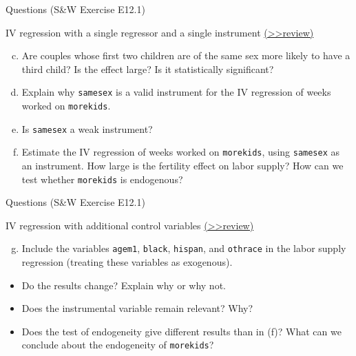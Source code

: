 \documentclass[
  10pt,
  ignorenonframetext,
]{beamer}
\providecommand{\tightlist}{%
  \setlength{\itemsep}{0pt}\setlength{\parskip}{0pt}}
\begin{document}
\begin{frame}[fragile]{Questions (S\&W Exercise E12.1)}
\protect\hypertarget{IVQ}{}
\begin{block}{IV regression with a single regressor and a single
instrument}
\protect\hypertarget{iv-regression-with-a-single-regressor-and-a-single-instrument}{}
\footnotesize\protect\hyperlink{IVCG}{(\textgreater\textgreater review)}
\normalsize

\begin{enumerate}
[(a)]
\setcounter{enumi}{2}
\item
  Are couples whose first two children are of the same sex more likely
  to have a third child? Is the effect large? Is it statistically
  significant?
\item
  Explain why \texttt{samesex} is a valid instrument for the IV
  regression of weeks worked on \texttt{morekids}.
\item
  Is \texttt{samesex} a weak instrument?
\item
  Estimate the IV regression of weeks worked on \texttt{morekids}, using
  \texttt{samesex} as an instrument. How large is the fertility effect
  on labor supply? How can we test whether \texttt{morekids} is
  endogenous?
\end{enumerate}
\end{block}
\end{frame}

\begin{frame}[fragile]{Questions (S\&W Exercise E12.1)}
\protect\hypertarget{IVCQ}{}
\begin{block}{IV regression with additional control variables}
\protect\hypertarget{iv-regression-with-additional-control-variables}{}
\footnotesize\protect\hyperlink{IVCCG}{(\textgreater\textgreater review)}
\normalsize

\begin{enumerate}
[(a)]
\setcounter{enumi}{6}
\tightlist
\item
  Include the variables \texttt{agem1}, \texttt{black}, \texttt{hispan},
  and \texttt{othrace} in the labor supply regression (treating these
  variables as exogenous).
\end{enumerate}

\begin{itemize}
\item
  Do the results change? Explain why or why not.
\item
  Does the instrumental variable remain relevant? Why?
\item
  Does the test of endogeneity give different results than in (f)? What
  can we conclude about the endogeneity of \texttt{morekids}?
\end{itemize}
\end{block}
\end{frame}
\end{document}
